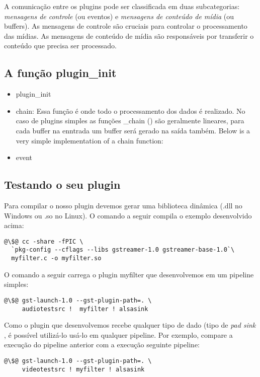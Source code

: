 A comunicação entre os plugins pode ser classificada em duas subcategorias:
\emph{mensagens de controle} (ou eventos) e \emph{mensagens de conteúdo de
mídia} (ou buffers).  As mensagens de controle são cruciais para controlar o
processamento das mídias.  As mensagens de conteúdo de mídia são responsáveis
por transferir o conteúdo que precisa ser processado.

\subsection*{A função plugin\_init}
\begin{itemize}
  \item plugin\_init
  \item chain: Essa função é onde todo o processamento dos dados é realizado.
        No caso de plugins simples as funções \_chain () são geralmente lineares,
        para cada buffer na enntrada um buffer será gerado na saída também.
        Below is a very simple implementation of a chain function: 
  \item event
\end{itemize}

\subsection*{Testando o seu plugin}
Para compilar o nosso plugin devemos gerar uma biblioteca dinâmica (.dll no
Windows ou .so no Linux).  O comando a seguir compila o exemplo desenvolvido
acima:

\begin{lstlisting}[style=command]
@\$@ cc -share -fPIC \
  `pkg-config --cflags --libs gstreamer-1.0 gstreamer-base-1.0`\
  myfilter.c -o myfilter.so
\end{lstlisting}

O comando a seguir carrega o plugin myfilter que desenvolvemos em um pipeline
simples:

\begin{lstlisting}[style=command]
@\$@ gst-launch-1.0 --gst-plugin-path=. \
     audiotestsrc !  myfilter ! alsasink
\end{lstlisting}

Como o plugin que desenvolvemos recebe qualquer tipo de dado (tipo de \emph{pad
sink} \C{ANY}, é possível utilizá-lo usá-lo em qualquer pipeline.  Por exemplo,
compare a execução do pipeline anterior com a execução seguinte pipeline:

\begin{lstlisting}[style=command]
@\$@ gst-launch-1.0 --gst-plugin-path=. \
     videotestsrc ! myfilter ! alsasink
\end{lstlisting}

